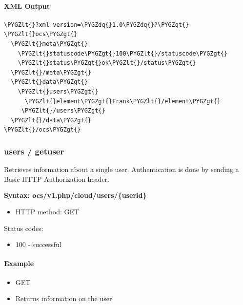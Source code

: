 \documentclass[letterpaper,10pt,english]{sphinxmanual}
\def\PYGZlt{\char`\<}
\def\PYGZgt{\char`\>}
\def\PYGZdq{\char`\"}
\begin{document}
\paragraph{XML Output}
\label{configuration_user/user_provisioning_api:id2}
\begin{Verbatim}[commandchars=\\\{\}]
\PYGZlt{}?xml version=\PYGZdq{}1.0\PYGZdq{}?\PYGZgt{}
\PYGZlt{}ocs\PYGZgt{}
  \PYGZlt{}meta\PYGZgt{}
    \PYGZlt{}statuscode\PYGZgt{}100\PYGZlt{}/statuscode\PYGZgt{}
    \PYGZlt{}status\PYGZgt{}ok\PYGZlt{}/status\PYGZgt{}
  \PYGZlt{}/meta\PYGZgt{}
  \PYGZlt{}data\PYGZgt{}
    \PYGZlt{}users\PYGZgt{}
      \PYGZlt{}element\PYGZgt{}Frank\PYGZlt{}/element\PYGZgt{}
     \PYGZlt{}/users\PYGZgt{}
  \PYGZlt{}/data\PYGZgt{}
\PYGZlt{}/ocs\PYGZgt{}
\end{Verbatim}


\subsubsection{\textbf{users / getuser}}
\label{configuration_user/user_provisioning_api:users-getuser}
Retrieves information about a single user. Authentication is done by sending a
Basic HTTP Authorization header.

\textbf{Syntax: ocs/v1.php/cloud/users/\{userid\}}
\begin{itemize}
\item {} 
HTTP method: GET

\end{itemize}

Status codes:
\begin{itemize}
\item {} 
100 - successful

\end{itemize}


\paragraph{Example}
\label{configuration_user/user_provisioning_api:id3}\begin{itemize}
\item {} 
GET 

\item {} 
Returns information on the user 

\end{itemize}
\end{document}
